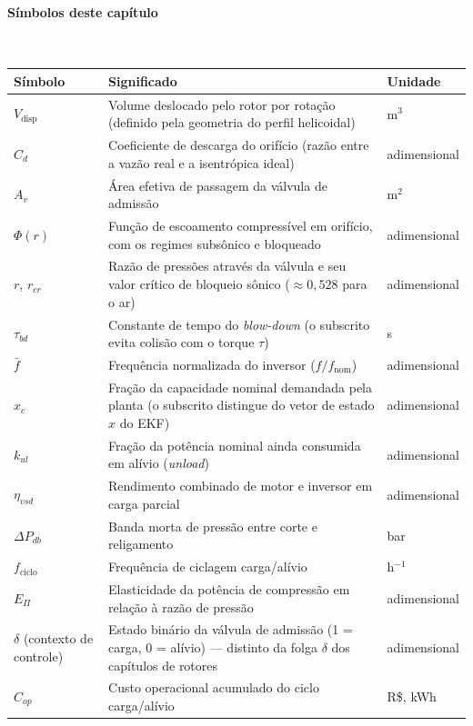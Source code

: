 \documentclass[12pt,a4paper]{article}
\numberwithin{equation}{section}
\numberwithin{table}{section}
\numberwithin{figure}{section}
\begin{document}
\paragraph{Símbolos deste capítulo}\mbox{}\\[-0.5em]
{\small
\begin{longtable}{>{\raggedright\arraybackslash}p{2.6cm} >{\raggedright\arraybackslash}p{9.2cm} >{\raggedright\arraybackslash}p{2.6cm}}
	\toprule
	\textbf{Símbolo} & \textbf{Significado} & \textbf{Unidade} \\ \midrule
	\endhead
	$V_{\text{disp}}$ & Volume deslocado pelo rotor por rotação (definido pela geometria do perfil helicoidal) & m$^3$ \\
	$C_d$ & Coeficiente de descarga do orifício (razão entre a vazão real e a isentrópica ideal) & adimensional \\
	$A_v$ & Área efetiva de passagem da válvula de admissão & m$^2$ \\
	$\Phi(r)$ & Função de escoamento compressível em orifício, com os regimes subsônico e bloqueado & adimensional \\
	$r$, $r_{cr}$ & Razão de pressões através da válvula e seu valor crítico de bloqueio sônico ($\approx 0{,}528$ para o ar) & adimensional \\
	$\tau_{bd}$\dag & Constante de tempo do \textit{blow-down} (o subscrito evita colisão com o torque $\tau$) & s \\
	$\bar{f}$ & Frequência normalizada do inversor ($f/f_{\text{nom}}$) & adimensional \\
	$x_c$\dag & Fração da capacidade nominal demandada pela planta (o subscrito distingue do vetor de estado $x$ do EKF) & adimensional \\
	$k_{ul}$ & Fração da potência nominal ainda consumida em alívio (\textit{unload}) & adimensional \\
	$\eta_{vsd}$ & Rendimento combinado de motor e inversor em carga parcial & adimensional \\
	$\Delta P_{db}$ & Banda morta de pressão entre corte e religamento & bar \\
	$f_{\text{ciclo}}$ & Frequência de ciclagem carga/alívio & h$^{-1}$ \\
	$E_{\Pi}$ & Elasticidade da potência de compressão em relação à razão de pressão & adimensional \\
	$\delta$ (contexto de controle)\dag & Estado binário da válvula de admissão (1 = carga, 0 = alívio) — distinto da folga $\delta$ dos capítulos de rotores & adimensional \\
	$C_{op}$ & Custo operacional acumulado do ciclo carga/alívio & R\$, kWh \\
	\bottomrule
\end{longtable}
}
\end{document}
